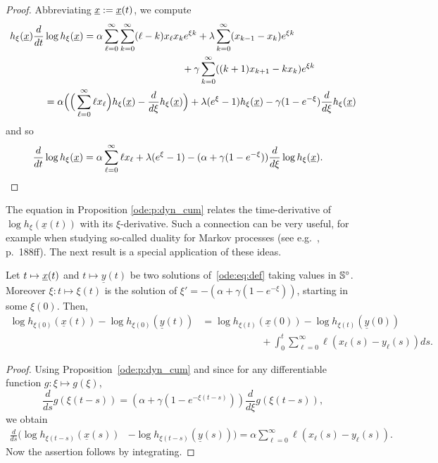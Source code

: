 \begin{proof}
Abbreviating $\underline{x} :=  \underline{x} \! \left( t \right) $, we compute
\begin{align*}
h_\xi(\underline x) \frac{d}{dt} & \log h_\xi(\underline{x}) 
= \alpha \sum_{\ell =0}^\infty\sum_{k=0}^\infty (\ell -k)x_\ell  x_k e^{\xi k} +
  \lambda \sum_{k=0}^\infty (x_{k-1} -x_k)e^{\xi k} \\ 
& \qquad \qquad \qquad \qquad \qquad \qquad \qquad + \gamma
  \sum_{k=0}^\infty ((k+1)x_{k+1} - kx_k)e^{\xi k} \\ 
& = \alpha \Big( \Big(\sum_{\ell =0}^\infty \ell  x_\ell \Big) h_\xi(\underline{x}) -
  \frac{d}{d\xi} h_\xi(\underline x)\Big) + \lambda(e^\xi-1)
  h_\xi(\underline{x}) - \gamma (1-e^{-\xi}) \frac{d}{d\xi}
  h_\xi(\underline{x})
\end{align*}
and so
\begin{align*}
\frac{d}{dt} \log h_\xi(\underline{x}) & = \alpha \sum_{\ell=0}^\infty \ell x_\ell 
+ \lambda(e^\xi -1)- (\alpha + \gamma(1-e^{-\xi}))\frac{d}{d\xi} \log h_\xi(\underline{x}).
\qedhere
\end{align*}
\end{proof}

\noindent
The equation in Proposition \ref{ode:p:dyn_cum} relates the time-derivative of 
$\log h_\xi(\underline x(t))$ with its $\xi$-derivative. Such a connection can
be very useful, for example when studying so-called duality for Markov processes (see
e.g.\ \cite{ethier_markov_2005}, p.\ 188ff). The next result is a special application of these ideas.

\begin{Corollary}[Duality]\label{ode:c:duality}
Let $t\mapsto  \underline{x} \! \left( t \right) $ and $t\mapsto \underline y(t)$ be two solutions of~\eqref{ode:eq:def}
taking values in $\mathbb{S}^\circ$. Moreover $\xi: t \mapsto \xi(t)$ is the solution of 
$\xi' = -(\alpha + \gamma(1-e^{-\xi}))$, starting in some $\xi(0)$. Then,
\begin{align*}
\log h_{\xi(0)}(\underline x(t)) - \log h_{\xi(0)}(\underline y(t)) 
&= \log h_{\xi(t)}(\underline x(0)) - \log h_{\xi(t)}(\underline y(0)) \\ 
& \qquad \qquad \qquad + \int_0^t \sum_{\ell =0}^\infty \ell (x_\ell (s) - y_\ell (s)) ds.
  \end{align*}
\end{Corollary}

\begin{proof}
Using Proposition~\ref{ode:p:dyn_cum} and since for any differentiable function 
$g: \xi\mapsto g(\xi)$, 
$$\frac{d}{ds} g(\xi(t-s)) = (\alpha + \gamma(1-e^{-\xi(t-s)}))\frac{d}{d\xi} g(\xi(t-s)),  $$ 
we obtain
\begin{align*}
\frac{d}{ds} \Big(\log h_{\xi(t-s)}(\underline x(s)) & - \log
h_{\xi(t-s)}(\underline y(s))\Big) = \alpha \sum_{\ell =0}^\infty
\ell (x_\ell (s) - y_\ell (s)).
\end{align*}
Now the assertion follows by integrating.
\end{proof}

